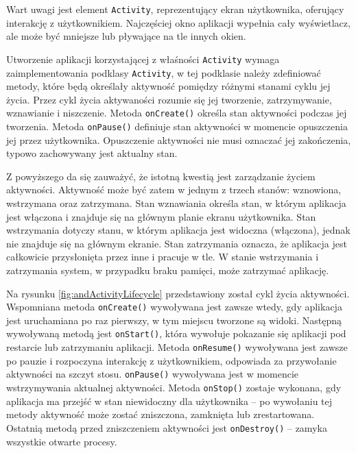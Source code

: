 \documentclass[eng,printmode,oneside]{mgr}
\begin{document}
Wart uwagi jest element \texttt{Activity}, reprezentujący ekran użytkownika,
oferujący interakcję z użytkownikiem. Najczęściej okno aplikacji wypełnia
cały wyświetlacz, ale może być mniejsze lub pływające na tle innych okien.

Utworzenie aplikacji korzystającej z właśności \texttt{Activity} wymaga
zaimplementowania podklasy \texttt{Activity}, w tej podklasie należy zdefiniować metody, które będą
określały aktywność pomiędzy różnymi stanami cyklu jej życia. Przez cykl życia
aktywaności rozumie się jej tworzenie, zatrzymywanie, wznawianie i niszczenie.
Metoda \texttt{onCreate()} określa stan aktywności podczas jej tworzenia. Metoda
\texttt{onPause()} definiuje stan aktywności w momencie opuszczenia jej przez
użytkownika. Opuszczenie aktywności nie musi oznaczać jej zakończenia, typowo
zachowywany jest aktualny stan.

Z powyższego da się zauważyć, że istotną kwestią jest zarządzanie życiem
aktywności. Aktywność może być zatem w jednym z trzech stanów: wznowiona, 
wstrzymana oraz zatrzymana. Stan wznawiania określa stan, w którym aplikacja
jest włączona i znajduje się na głównym planie ekranu użytkownika. Stan
wstrzymania dotyczy stanu, w którym aplikacja jest widoczna (włączona), jednak
nie znajduje się na głównym ekranie. Stan zatrzymania oznacza, że aplikacja jest
całkowicie przysłonięta przez inne i pracuje w tle. W stanie wstrzymania i
zatrzymania system, w przypadku braku pamięci, może zatrzymać aplikację.

Na rysunku \ref{fig:andActivityLifecycle} przedstawiony został cykl życia
aktywności. Wspomniana metoda \texttt{onCreate()} wywoływana jest zawsze wtedy,
gdy aplikacja jest uruchamiana po raz pierwszy, w tym miejscu tworzone są widoki.
Następną wywoływaną metodą jest \texttt{onStart()}, która wywołuje pokazanie się
aplikacji pod restarcie lub zatrzymaniu aplikacji. Metoda \texttt{onResume()} wywoływana jest
zawsze po pauzie i rozpoczyna interakcję z użytkownikiem, odpowiada za
przywołanie aktywności na szczyt stosu. \texttt{onPause()} wywoływana jest w
momencie wstrzymywania aktualnej aktywności. Metoda \texttt{onStop()} zostaje
wykonana, gdy aplikacja ma przejść w stan niewidoczny dla użytkownika -- po
wywołaniu tej metody aktywność może zostać zniszczona, zamknięta lub
zrestartowana.
Ostatnią metodą przed zniszczeniem aktywności jest \texttt{onDestroy()} -- zamyka
wszystkie otwarte procesy.
\end{document}
